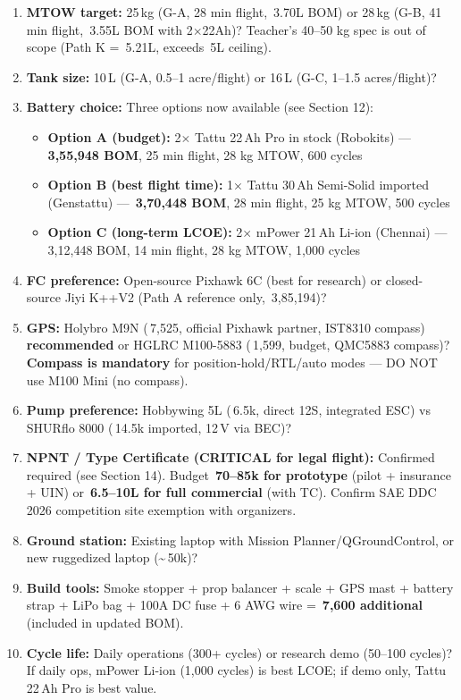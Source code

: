 \documentclass[11pt,a4paper]{article}
\newcommand{\Rs}{\rupee\,}
\begin{document}
\begin{enumerate}
  \item \textbf{MTOW target:} 25\,kg (G-A, 28 min flight, \Rs{}3.70L BOM) or 28\,kg (G-B, 41 min flight, \Rs{}3.55L BOM with 2$\times$22Ah)? Teacher's 40--50 kg spec is out of scope (Path K = \Rs{}5.21L, exceeds \Rs{}5L ceiling).
  \item \textbf{Tank size:} 10\,L (G-A, 0.5--1 acre/flight) or 16\,L (G-C, 1--1.5 acres/flight)?
  \item \textbf{Battery choice:} Three options now available (see Section 12):
    \begin{itemize}
      \item \textbf{Option A (budget):} 2$\times$ Tattu 22\,Ah Pro in stock (Robokits) --- \textbf{\Rs{}3,55,948 BOM}, 25 min flight, 28 kg MTOW, 600 cycles
      \item \textbf{Option B (best flight time):} 1$\times$ Tattu 30\,Ah Semi-Solid imported (Genstattu) --- \textbf{\Rs{}3,70,448 BOM}, 28 min flight, 25 kg MTOW, 500 cycles
      \item \textbf{Option C (long-term LCOE):} 2$\times$ mPower 21\,Ah Li-ion (Chennai) --- \Rs{}3,12,448 BOM, 14 min flight, 28 kg MTOW, 1,000 cycles
    \end{itemize}
  \item \textbf{FC preference:} Open-source Pixhawk 6C (best for research) or closed-source Jiyi K++V2 (Path A reference only, \Rs{}3,85,194)?
  \item \textbf{GPS:} Holybro M9N (\Rs{}7,525, official Pixhawk partner, IST8310 compass) \textbf{recommended} or HGLRC M100-5883 (\Rs{}1,599, budget, QMC5883 compass)? \textbf{Compass is mandatory} for position-hold/RTL/auto modes --- DO NOT use M100 Mini (no compass).
  \item \textbf{Pump preference:} Hobbywing 5L (\Rs{}6.5k, direct 12S, integrated ESC) vs SHURflo 8000 (\Rs{}14.5k imported, 12\,V via BEC)?
  \item \textbf{NPNT / Type Certificate (CRITICAL for legal flight):} Confirmed required (see Section 14). Budget \textbf{\Rs{}70--85k for prototype} (pilot + insurance + UIN) or \textbf{\Rs{}6.5--10L for full commercial} (with TC). Confirm SAE DDC 2026 competition site exemption with organizers.
  \item \textbf{Ground station:} Existing laptop with Mission Planner/QGroundControl, or new ruggedized laptop (\textasciitilde{}\Rs{}50k)?
  \item \textbf{Build tools:} Smoke stopper + prop balancer + scale + GPS mast + battery strap + LiPo bag + 100A DC fuse + 6 AWG wire = \textbf{\Rs{}7,600 additional} (included in updated BOM).
  \item \textbf{Cycle life:} Daily operations (300+ cycles) or research demo (50--100 cycles)? If daily ops, mPower Li-ion (1,000 cycles) is best LCOE; if demo only, Tattu 22\,Ah Pro is best value.
\end{enumerate}
\end{document}
